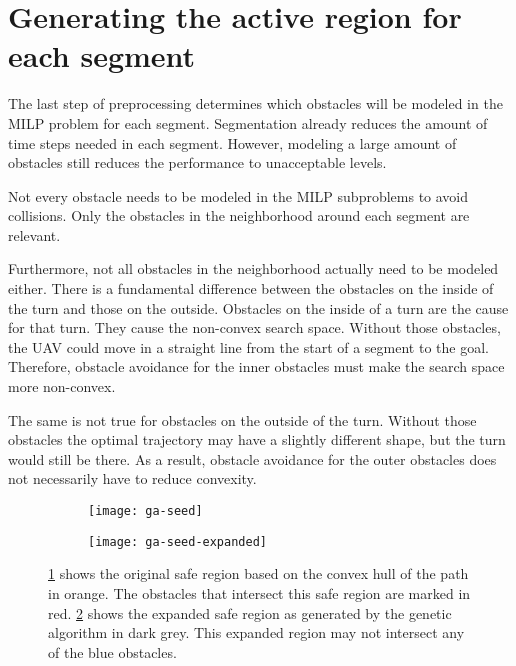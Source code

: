 \clearpage

\section{Generating the active region for each segment}
The last step of preprocessing determines which obstacles will be modeled in the MILP problem for each segment. Segmentation already reduces the amount of time steps needed in each segment. However, modeling a large amount of obstacles still reduces the performance to unacceptable levels. 
\par
Not every obstacle needs to be modeled in the MILP subproblems to avoid collisions. Only the obstacles in the neighborhood around each segment are relevant. 
\par
Furthermore, not all obstacles in the neighborhood actually need to be modeled either. There is a fundamental difference between the obstacles on the inside of the turn and those on the outside. Obstacles on the inside of a turn are the cause for that turn. They cause the non-convex search space. Without those obstacles, the UAV could move in a straight line from the start of a segment to the goal. Therefore, obstacle avoidance for the inner obstacles must make the search space more non-convex.
\par
The same is not true for obstacles on the outside of the turn. Without those obstacles the optimal trajectory may have a slightly different shape, but the turn would still be there. As a result, obstacle avoidance for the outer obstacles does not necessarily have to reduce convexity. \\

\begin{figure}[h]
	\centering
	\begin{subfigure}[t]{0.45\columnwidth}
        		\texttt{[image: ga-seed]}
        		\caption{}
        		 \label{fig:ga-seed}
	\end{subfigure}	
	\hfill
	\begin{subfigure}[t]{0.45\columnwidth}
        		\texttt{[image: ga-seed-expanded]}
        		\caption{}
        		 \label{fig:ga-seed-expanded}
	\end{subfigure}		
	\caption[A demonstration of the input and output of the genetic algorithm]{\ref{fig:ga-seed} shows the original safe region based on the convex hull of the path in orange. The obstacles that intersect this safe region are marked in red. \ref{fig:ga-seed-expanded} shows the expanded safe region as generated by the genetic algorithm in dark grey. This expanded region may not intersect any of the blue obstacles.}
    \label{fig:ga-seed-demo}     
\end{figure}

